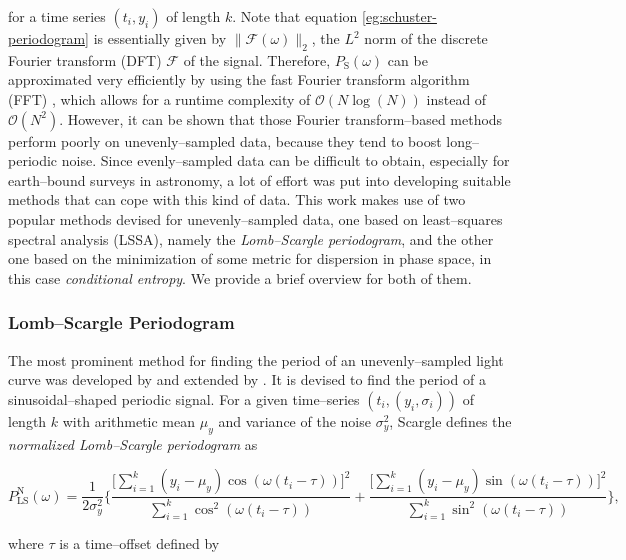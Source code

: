 for a time series $(t_i, y_i)$ of length $k$. Note that equation \eqref{eg:schuster-periodogram} is essentially given by $\| \mathcal{F}(\omega) \|_2 $, the $L^2$ norm of the discrete Fourier transform (DFT) $\mathcal{F}$ of the signal. Therefore, $P_{\text{S}}(\omega)$ can be approximated very efficiently by using the fast Fourier transform algorithm (FFT) \citep{cooley1965}, which allows for a runtime complexity of $\mathcal{O}(N\log{(N)})$ instead of $\mathcal{O}(N^2)$. However, it can be shown that those Fourier transform--based methods perform poorly on unevenly--sampled data, because they tend to boost long--periodic noise. Since evenly--sampled data can be difficult to obtain, especially for earth--bound surveys in astronomy, a lot of effort was put into developing suitable methods that can cope with this kind of data. This work makes use of two popular methods devised for unevenly--sampled data, one based on least--squares spectral analysis (LSSA), namely the \emph{Lomb--Scargle periodogram}, and the other one based on the minimization of some metric for dispersion in phase space, in this case \emph{conditional entropy}. We provide a brief overview for both of them.

\subsubsection{Lomb--Scargle Periodogram}
\label{subsubsec:lomb-scargle}

The most prominent method for finding the period of an unevenly--sampled light curve was developed by \citet{lomb1976} and extended by \citet{scargle1982}. It is devised to find the period of a sinusoidal--shaped periodic signal. For a given time--series $(t_i, (y_i, \sigma_i))$ of length $k$ with arithmetic mean $\mu_y$ and variance of the noise $\sigma_y^2$, Scargle defines the \emph{normalized Lomb--Scargle periodogram} as

\begin{equation}
\label{eq:normalized-lomb-scargle}
P^{\text{N}}_{\text{LS}}(\omega) = \frac{1}{2 \sigma_y^2} \Bigg\{ \frac{\big[\sum\limits_{i=1}^k (y_i - \mu_y) \cos(\omega(t_i - \tau))\big]^2}{\sum\limits_{i=1}^k \cos^2(\omega(t_i - \tau))} + \frac{\big[\sum\limits_{i=1}^k (y_i - \mu_y) \sin(\omega(t_i - \tau))\big]^2}{\sum\limits_{i=1}^k \sin^2(\omega(t_i - \tau))}\Bigg\},
\end{equation}

where $\tau$ is a time--offset defined by

